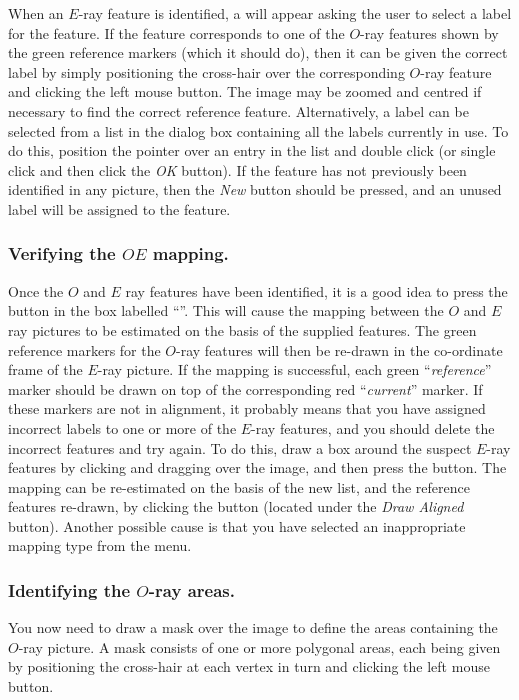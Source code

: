When an $E$-ray feature is identified, a  will appear asking the user to select a label for
the feature. If the feature corresponds to one of the $O$-ray features
shown by the green reference markers (which it should do), then it can be
given the correct label by simply positioning the cross-hair over the
corresponding $O$-ray feature and clicking the left mouse button. The
image may be zoomed and centred if necessary to find the correct
reference feature. Alternatively, a label can be selected from a list in
the dialog box containing all the labels currently in use. To do this,
position the pointer over an entry in the list and double click (or
single click and then click the {\em OK} button). If the feature has not
previously been identified in any picture, then the {\em New} button
should be pressed, and an unused label will be assigned to the feature.

\subsubsection {Verifying the $OE$ mapping.}
Once the $O$ and $E$ ray features have been identified, it is a good idea
to press the  button in
the box labelled ``''. This
will cause the mapping between the $O$ and $E$ ray pictures to be
estimated on the basis of the supplied features. The green reference
markers for the $O$-ray features will then be re-drawn in the co-ordinate
frame of the $E$-ray picture. If the mapping is successful, each green
``{\em reference}'' marker should be drawn on top of the corresponding
red ``{\em current}'' marker. If these markers are not in alignment, it
probably means that you have assigned incorrect labels to one or more of
the $E$-ray features, and you should delete the incorrect features and
try again. To do this, draw a box around the suspect $E$-ray features by
clicking and dragging over the image, and then press the  button. The mapping can be re-estimated on the
basis of the new list, and the reference features re-drawn, by clicking
the  button (located under the {\em
Draw Aligned} button). Another possible cause is that you have selected
an inappropriate mapping type from the  menu.

\subsubsection {Identifying the $O$-ray areas.}
You now need to draw a mask over the image to define the areas containing
the $O$-ray picture. A mask consists of one or more polygonal areas, each
being given by positioning the cross-hair at each vertex in turn and
clicking the left mouse button.

